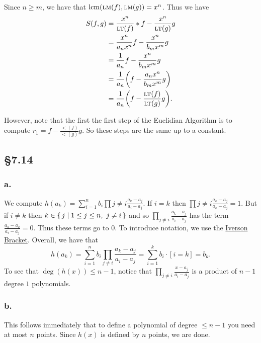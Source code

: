 \documentclass[letterpaper]{article}
\begin{document}
Since $n \geq m$, we have that $\operatorname{lcm}(\operatorname{\textsc{lm}}(f), \operatorname{\textsc{lm}}(g)) = x^{n}$.
Thus we have
\begin{align*}
  S(f, g) &= \frac{x^{n}}{\lt(f)} * f - \frac{x^{n}}{\lt(g)}g \\
          &= \frac{x^{n}}{a_{n}x^{n}} f - \frac{x^{n}}{b_{m}x^{m}}g \\
          &= \frac{1}{a_{n}}f - \frac{x^{n}}{b_{m}x^{m}}g \\
          &= \frac{1}{a_{n}}\pqty{f - \frac{a_{n}x^{n}}{b_{m}x^{m}}g} \\
          &= \frac{1}{a_{n}}\pqty{f - \frac{\lt(f)}{\lt(g)}g}.
\end{align*}

However, note that the first the first step of the Euclidian Algorithm is to compute $r_{1} = f - \frac{\lt(f)}{\lt(g)}g$.
So these steps are the same up to a constant.

\clearpage

\subsection*{\S 7.14}

\subsubsection*{a.}

We compute $h(a_{k}) = \sum_{i = 1}^{n} b_{i} \prod{j \neq i} \frac{a_{k} - a_{j}}{a_{i} - a_{j}}$.
If $i = k$ then $\prod{j \neq i} \frac{a_{k} - a_{j}}{a_{k} - a_{j}} = 1$.
But if $i \neq k$ then $k \in \set{j | 1 \leq j \leq n,\ j \neq i}$ and so $\prod_{j \neq i} \frac{a_{k} - a_{j}}{a_{i} - a_{j}}$ has the term $\frac{a_{k} - a_{k}}{a_{i} - a_{j}} = 0$.
Thus these terms go to $0$.
To introduce notation, we use the \href{https://en.wikipedia.org/wiki/Iverson_bracket}{Iverson Bracket}.
Overall, we have that
\[
  h(a_{k}) = \sum_{i = 1}^{n} b_{i} \prod_{j \neq i} \frac{a_{k} - a_{j}}{a_{i} - a_{j}} = \sum_{i = 1}^{k} b_{i} \cdot [i = k] = b_{k}.
\]
To see that $\deg(h(x)) \leq n - 1$, notice that $\prod_{j \neq i} \frac{x - a_{j}}{a_{i} - a_{j}}$ is a product of $n - 1$ degree $1$ polynomials.

\subsubsection*{b.}

This follows immediately that to define a polynomial of degree $\leq n - 1$ you need at most $n$ points.
Since $h(x)$ is defined by $n$ points, we are done.
\end{document}
